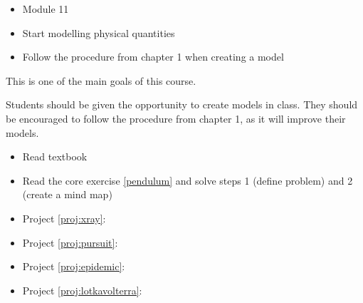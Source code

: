 \begin{lesson}

	\begin{itemize}
		\item Module 11
	\end{itemize}

	\begin{itemize}
		\item Start modelling physical quantities
		\item Follow the procedure from chapter 1 when creating a model
	\end{itemize}
	

This is one of the main goals of this course. 

Students should be given the opportunity to create models in class. They should be encouraged to follow the procedure from chapter 1, as it will improve their models.


\begin{itemize}
	\item Read textbook
	\item Read the core exercise \ref{pendulum} and solve steps 1 (define problem) and 2 (create a mind map)
\end{itemize}


\begin{itemize}
	\item Project \ref{proj:xray}: \xraytitle
	\item Project \ref{proj:pursuit}: \pursuittitle
	\item Project \ref{proj:epidemic}: \epidemictitle
	\item Project \ref{proj:lotkavolterra}: \lotkavolterratitle
\end{itemize}


\end{lesson}






